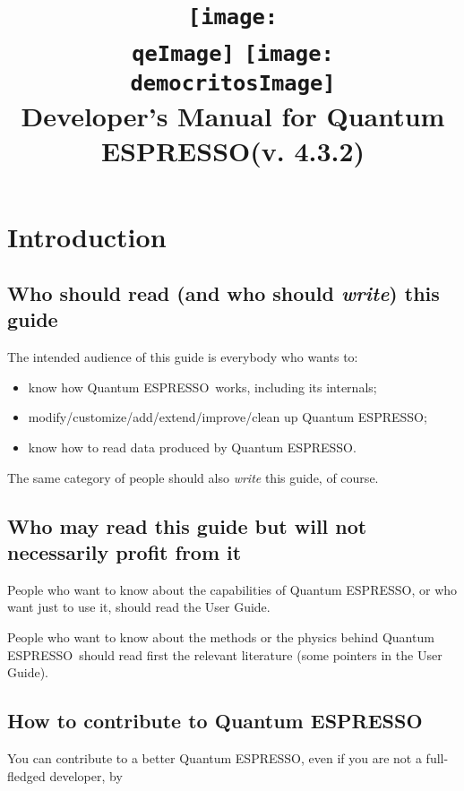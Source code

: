 \documentclass[12pt,a4paper]{article}
\def\version{4.3.2}
\def\qe{{\sc Quantum ESPRESSO}}
\def\qeImage{quantum_espresso.pdf}
\def\democritosImage{democritos.pdf}
\def\qeImage{quantum_espresso.png}
\def\democritosImage{democritos.png}
\begin{document}
 
\author{}
\date{}
\title{
  \texttt{[image: \\qeImage]} \hskip 2cm
  \texttt{[image: \\democritosImage]}\\
  \vskip 1cm
  \Huge Developer's Manual for \qe (v. \version) \smallskip
}
\maketitle

\tableofcontents

\section{Introduction}
\subsection{Who should read (and who should {\em write}) this guide}

The intended audience of this guide is everybody who wants to:
\begin{itemize}
\item know how \qe\ works, including its internals;
\item modify/customize/add/extend/improve/clean up \qe;
\item know how to read data produced by \qe.
\end{itemize}
The same category of people should also {\em write} this guide, of course.

\subsection{Who may read this guide but will not necessarily profit from it}

People who want to know about the capabilities of \qe,
or who want just to use it, should read the User Guide.

People who want to know about the methods or the physics
behind \qe\ should read first the relevant  
literature (some pointers in the User Guide).

\subsection{How to contribute to \qe}

You can contribute to a better \qe, even if you are
not a full-fledged developer, by
\end{document}
